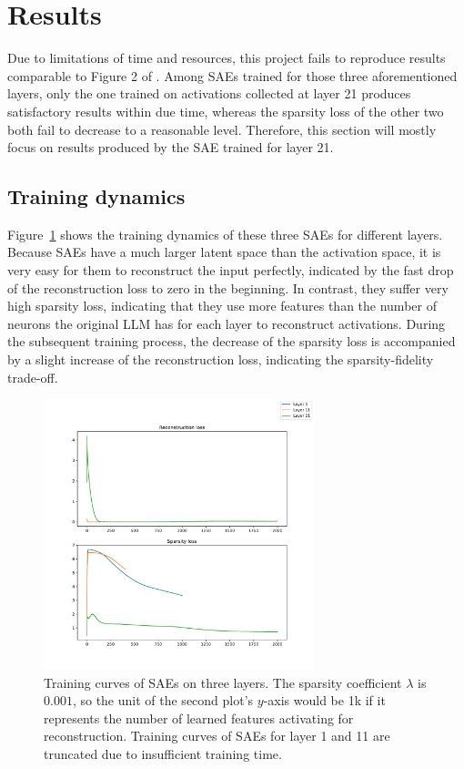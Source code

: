\documentclass{article}
\begin{document}
\section{Results}
\label{sec:results}

Due to limitations of time and resources, this project fails to reproduce results comparable to
Figure 2 of \cite{lieberum2024Gemma}. Among SAEs trained for those three aforementioned layers, only
the one trained on activations collected at layer 21 produces satisfactory results within due time,
whereas the sparsity loss of the other two both fail to decrease to a reasonable level. Therefore,
this section will mostly focus on results produced by the SAE trained for layer 21.

\subsection{Training dynamics}
\label{sec:training-curves}

Figure~\ref{fig:curves} shows the training dynamics of these three SAEs for different
layers. Because SAEs have a much larger latent space than the activation space, it is very easy for
them to reconstruct the input perfectly, indicated by the fast drop of the reconstruction loss to
zero in the beginning. In contrast, they suffer very high sparsity loss, indicating that they use
more features than the number of neurons the original LLM has for each layer to reconstruct
activations.  During the subsequent training process, the decrease of the sparsity loss is
accompanied by a slight increase of the reconstruction loss, indicating the sparsity-fidelity
trade-off.

\begin{figure}[htbp]
\centerline{\includegraphics[width=0.7\textwidth]{figures/train-curves.pdf}}
\caption{Training curves of SAEs on three layers. The sparsity coefficient \(\lambda\) is \(0.001\), so
  the unit of the second plot's \(y\)-axis would be 1k if it represents the number of learned
  features activating for reconstruction. Training curves of SAEs for layer 1 and 11 are truncated
  due to insufficient training time.}
\label{fig:curves}
\end{figure}
\end{document}
